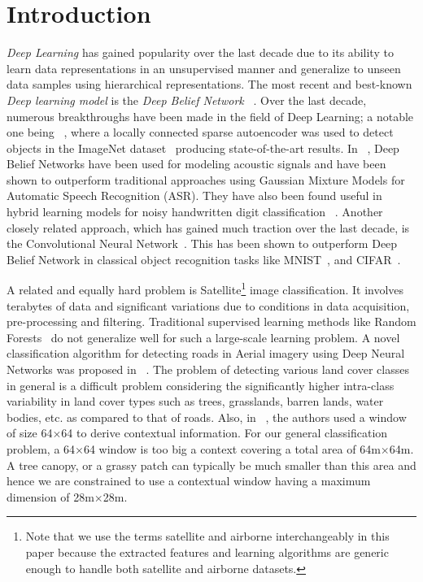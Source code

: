 \documentclass[11pt,a4paper]{article}
\begin{document}
\vspace{20 mm}





\section{Introduction}
\emph{Deep Learning} has gained popularity over the last decade due to its ability to learn data representations in an unsupervised manner and generalize to unseen data samples using hierarchical representations. The most recent and best-known \emph{Deep learning model} is the \emph{Deep Belief Network} ~\cite{Hinton06afast}. Over the last decade, numerous breakthroughs have been made in the field of Deep Learning; a notable one being ~\cite{QuocCCDN12}, where a locally connected sparse autoencoder was used to detect objects in the ImageNet dataset~\cite{Deng09imagenet} producing state-of-the-art results. In ~\cite{MohamedDH12}, Deep Belief Networks have been used for modeling acoustic signals and have been shown to outperform traditional approaches using Gaussian Mixture Models for Automatic Speech Recognition (ASR). They have also been found useful in hybrid learning models for noisy handwritten digit classification ~\cite{basuesann2015}. Another closely related approach, which has gained much traction over the last decade, is the Convolutional Neural Network~\cite{Lecun98gradient-basedlearning}. This has been shown to outperform Deep Belief Network in classical object recognition tasks like MNIST~\cite{mnist}, and CIFAR~\cite{Krizhevsky09learningmultiple}.

A related and equally hard problem is Satellite\footnote{Note that we use the terms satellite and airborne interchangeably in this paper because the extracted features and  learning algorithms are generic enough to handle both satellite and airborne datasets.} image classification. It involves terabytes of data and significant variations due to conditions in data acquisition, pre-processing and filtering. Traditional supervised learning methods like Random Forests~\cite{Breiman:2001} do not generalize well for such a large-scale learning problem. A novel classification algorithm for detecting roads in Aerial imagery using Deep Neural Networks was proposed in ~\cite{MnihHinton2010}. The problem of detecting various land cover classes in general is a difficult problem considering the significantly higher intra-class variability in land cover types such as trees, grasslands, barren lands, water bodies, etc. as compared to that of roads. Also, in ~\cite{MnihHinton2010}, the authors used a window of size 64$\times$64 to derive contextual information. For our general classification problem, a 64$\times$64 window is too big a context covering a total area of 64m$\times$64m. A tree canopy, or a grassy patch can typically be much smaller than this area and hence we are constrained to use a contextual window having a maximum dimension of 28m$\times$28m.
\end{document}
